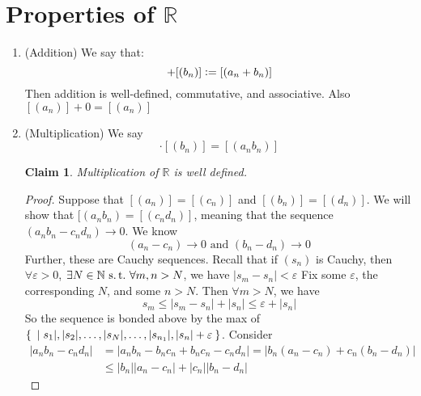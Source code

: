 \documentclass[12pt]{amsart}
\newcommand{\bbR}{\mathbb{R}}
\newcommand{\bbN}{\mathbb{N}}
\newcommand{\suchthat}{\operatorname{\thinspace s.t. \thinspace}}
\theoremstyle{plain}
\newtheorem*{claim}{Claim}
\theoremstyle{remark}
\theoremstyle{definition}
\begin{document}
\par
\section*{\bf Properties of $\bbR$}

\begin{enumerate}[(1)]
	\item (Addition)
		We say that: 
		\begin{equation*}
			[(a_n)] + [(b_n)] \vcentcolon = [(a_n+b_n)]
		\end{equation*}
		Then addition is well-defined, commutative, and associative. Also $[(a_n)] + 0 = [(a_n)]$
	\item (Multiplication)
		We say 
		\begin{equation*}
			[(a_n)]\cdot[(b_n)] = [(a_nb_n)]
		\end{equation*}
		\begin{claim}
			Multiplication of $\bbR$ is well defined.
		\end{claim}
		\begin{proof}
			Suppose that $[(a_n)] = [(c_n)]$ and $[(b_n)] = [(d_n)]$. We will show that $[(a_nb_n) = [(c_nd_n)]$, meaning that the sequence $(a_nb_n - c_nd_n) \rightarrow 0$.
			\newline
			We know 
			\begin{equation*}
				(a_n - c_n) \rightarrow 0 \mbox{ and } (b_n - d_n) \rightarrow 0
			\end{equation*}
			Further, these are Cauchy sequences. Recall that if $(s_n)$ is Cauchy, then $\forall \varepsilon > 0$, $\exists N \in\bbN \suchthat \forall m,n > N$, we have $|s_m - s_n| < \varepsilon$
			\newline
			Fix some $\varepsilon$, the corresponding $N$, and some $n > N$. Then $\forall m > N$, we have
			\begin{equation*}
			s_m \leqslant |s_m - s_n| + |s_n| \leqslant \varepsilon + |s_n|
			\end{equation*}
			So the sequence is bonded above by the max of $\Set{|s_1|, |s_2|, \dots,|s_N|,\dots,|s_{n_1}|,|s_n| + \varepsilon}$.
			Consider 
			\begin{equation*}
			\begin{split}
			|a_n b_n - c_n d_n| &= |a_n b_n - b_n c_n + b_n c_n - c_n d_n| = |b_n(a_n - c_n) + c_n(b_n - d_n)|\\
		&\leqslant |b_n||a_n - c_n| + |c_n||b_n - d_n|
			\end{split}
			\end{equation*}

\end{proof}
\end{enumerate}
\end{document}
